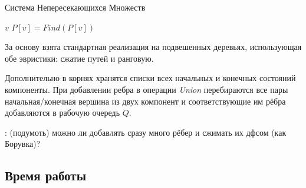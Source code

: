 \begin{algorithm}[h]
  \begin{algorithmic}[1]
  \caption{Система Непересекающихся Множеств}
  \label{algo:DSU}
          \EndFor
          \EndFor
          \EndFor
      \EndFunction
              \Return $v$
          \EndIf
          \Return $P[v] = Find(P[v])$
      \EndFunction
              \Return
          \EndIf
          \EndIf
      \EndFunction
  \EndStructure
  \end{algorithmic}
\end{algorithm}

За основу взята стандартная реализация \cite{Hopcroft1973} на подвешенных деревьях, использующая обе эвристики: сжатие путей и ранговую. 


Дополнительно в корнях хранятся списки всех начальных и конечных состояний компоненты. При добавлении ребра в операции \textit{Union} перебираются все пары начальная/конечная вершина из двух компонент и соответствующие им рёбра добавляются в рабочую очередь $Q$. 

\TODO: (подумоть) можно ли добавлять сразу много рёбер и сжимать их дфсом (как Борувка)?

\subsection*{Время работы}

